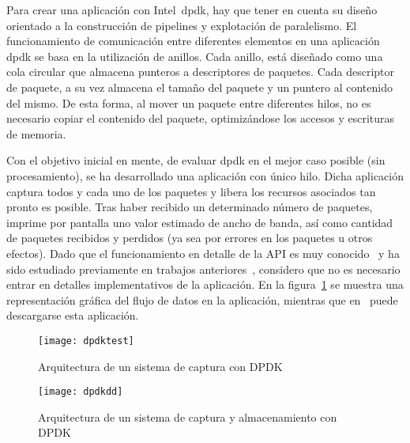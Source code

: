 
Para crear una aplicación con Intel~\gls{dpdk}, hay que tener en cuenta su diseño orientado a la construcción de pipelines y explotación de paralelismo. El funcionamiento de comunicación entre diferentes elementos en una aplicación \gls{dpdk} se basa en la utilización de anillos. Cada anillo, está diseñado como una cola circular que almacena punteros a descriptores de paquetes. Cada descriptor de paquete, a su vez almacena el tamaño del paquete y un puntero al contenido del mismo. De esta forma, al mover un paquete entre diferentes hilos, no es necesario copiar el contenido del paquete, optimizándose los accesos y escrituras de memoria.

Con el objetivo inicial en mente, de evaluar \gls{dpdk} en el mejor caso posible (sin procesamiento), se ha desarrollado una aplicación con único hilo. Dicha aplicación captura todos y cada uno de los paquetes y libera los recursos asociados tan pronto es posible. Tras haber recibido un determinado número de paquetes, imprime por pantalla uno valor estimado de ancho de banda, así como cantidad de paquetes recibidos y perdidos (ya sea por errores en los paquetes u otros efectos). Dado que el funcionamiento en detalle de la API es muy conocido~\cite{dpdk2015} y ha sido estudiado previamente en trabajos anteriores~\cite{rleira2013TFG,dpdk:Leir1306}, considero que no es necesario entrar en detalles implementativos de la aplicación. En la figura~\ref{fig:dis:dpdktest} se muestra una representación gráfica del flujo de datos en la aplicación, mientras que en~\cite{dpdkspeedometer} puede descargarse esta aplicación.

\begin{figure}[!th]
\centering
\texttt{[image: dpdktest]}
\caption{Arquitectura de un sistema de captura con DPDK}
\label{fig:dis:dpdktest}
\end{figure}


\begin{figure}[!th]
\centering
\texttt{[image: dpdkdd]}
\caption{Arquitectura de un sistema de captura y almacenamiento con DPDK}
\label{fig:dis:dpdkdd}
\end{figure}

